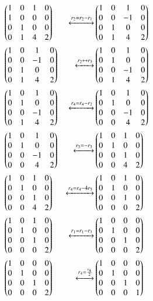 \begin{align}
& \begin{pmatrix}1 & 0 & 1 & 0 \\ 1 & 0 & 0 & 0 \\ 0 & 1 & 0 & 0 \\ 0 & 1 & 4 & 2\end{pmatrix} &  \xleftrightarrow[]{r_2=r_2-r_1} &
\begin{pmatrix}1 & 0 & 1 & 0 \\ 0 & 0 & -1 & 0 \\ 0 & 1 & 0 & 0 \\ 0 & 1 & 4 & 2\end{pmatrix} \\
& \begin{pmatrix}1 & 0 & 1 & 0 \\ 0 & 0 & -1 & 0 \\ 0 & 1 & 0 & 0 \\ 0 & 1 & 4 &2\end{pmatrix}      &\xleftrightarrow[]{r_2 \leftrightarrow r_3} &\begin{pmatrix}1 & 0 & 1 & 0 \\ 0 & 1 & 0 & 0 \\ 0 & 0 & -1 & 0 \\0&1&4& 2\end{pmatrix} \\
& \begin{pmatrix}1 & 0 & 1 & 0 \\ 0 & 1 & 0 & 0 \\ 0 & 0 & -1 & 0 \\0 & 1 & 4 & 2\end{pmatrix}&\xleftrightarrow[]{r_4=r_4-r_2}&
\begin{pmatrix}1 & 0 & 1 & 0 \\ 0 & 1 & 0 & 0 \\ 0 & 0 & -1 & 0 \\0 & 0 & 4 & 2\end{pmatrix} \\
& \begin{pmatrix}1 & 0 & 1 & 0 \\ 0 & 1 & 0 & 0 \\ 0 & 0 & -1 & 0 \\0 & 0 & 4 & 2\end{pmatrix}&\xleftrightarrow[]{r_3=-r_3}&
\begin{pmatrix}1 & 0 & 1 & 0 \\ 0 & 1 & 0 & 0 \\ 0 & 0 & 1 & 0 \\0 & 0 & 4 & 2\end{pmatrix} \\
& \begin{pmatrix}1 & 0 & 1 & 0 \\ 0 & 1 & 0 & 0 \\ 0 & 0 & 1 & 0 \\0 & 0 & 4 & 2\end{pmatrix} &\xleftrightarrow[]{r_4=r_4-4r_3}& \begin{pmatrix}1 & 0 & 1 & 0 \\ 0 & 1 & 0 & 0 \\ 0 & 0 & 1 & 0 \\0& 0& 0&2\end{pmatrix} \\ 
&\begin{pmatrix}1 & 0 & 1 & 0 \\ 0 & 1 & 0 & 0 \\ 0 & 0 & 1 & 0 \\0& 0& 0&2\end{pmatrix}&\xleftrightarrow[]{r_1=r_1-r_3}&
\begin{pmatrix}1 & 0 & 0 & 0 \\ 0 & 1 & 0 & 0 \\ 0 & 0 & 1 & 0 \\0& 0& 0&2\end{pmatrix}\\
& \begin{pmatrix}1 & 0 & 0 & 0 \\ 0 & 1 & 0 & 0 \\ 0 & 0 & 1 & 0 \\0& 0& 0&2\end{pmatrix} &\xleftrightarrow[]{r_4=\frac{r_4}{2}}& \begin{pmatrix}1 & 0 & 0 & 0 \\ 0 & 1 & 0 & 0 \\ 0 & 0 & 1 & 0 \\0& 0& 0&1\end{pmatrix}\label{eq:solutions/2/4/1/2}
\end{align}
